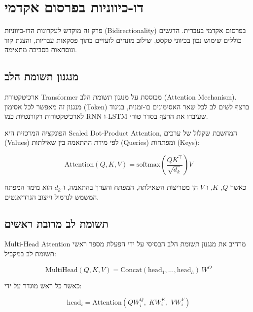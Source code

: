 \chapter{דו-כיווניות בפרסום אקדמי}

פרק זה מוקדש לעקרונות הדו-כיווניות (\textenglish{Bidirectionality}) בפרסום אקדמי
בעברית. הדגשים כוללים שימוש נכון בכיווני טקסט, שילוב מונחים לועזיים בתוך פסקאות
עבריות, והצגת קוד ונוסחאות בסביבה מתאימה.

\section{מנגנון תשומת הלב}

ארכיטקטורת \textenglish{Transformer} מבוססת על מנגנון תשומת הלב
(\textenglish{Attention Mechanism}). מנגנון זה מאפשר לכל אסימון (\textenglish{Token})
ברצף לשים לב לכל שאר האסימונים בו-זמנית, בניגוד לארכיטקטורות רקורנטיות כמו
\textenglish{RNN} ו-\textenglish{LSTM} שעיבדו את הרצף בסדר טורי.

הפונקציה המרכזית היא \textenglish{Scaled Dot-Product Attention}, המחשבת
שקלול של ערכים (\textenglish{Values}) לפי מידת ההתאמה בין שאילתות
(\textenglish{Queries}) ומפתחות (\textenglish{Keys}):

\begin{equation}
    \text{Attention}(Q, K, V) =
    \text{softmax}\!\left(\frac{QK^\top}{\sqrt{d_k}}\right)V
\end{equation}

כאשר \(Q\), \(K\), ו-\(V\) הן מטריצות השאילתה, המפתח והערך בהתאמה,
ו-\(d_k\) הוא מימד המפתח המשמש לנרמול וייצוב הגרדיאנטים.

\section{תשומת לב מרובת ראשים}

\textenglish{Multi-Head Attention} מרחיב את מנגנון תשומת הלב הבסיסי על ידי הפעלת
מספר ראשי תשומת לב במקביל:

\begin{equation}
    \text{MultiHead}(Q, K, V) =
    \text{Concat}(\text{head}_1, \ldots, \text{head}_h) \, W^O
\end{equation}

כאשר כל ראש מוגדר על ידי:

\begin{equation}
    \text{head}_i = \text{Attention}(Q W_i^Q,\; K W_i^K,\; V W_i^V)
\end{equation}

